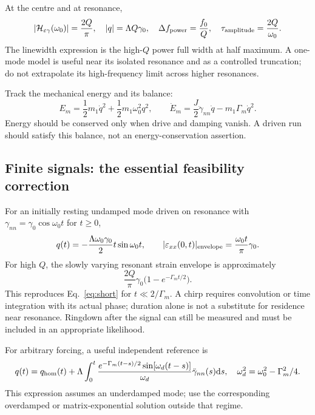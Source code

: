\documentclass[a4paper,11pt]{article}
\newcommand{\dd}{\mathrm{d}}
\newcommand{\eps}{\varepsilon}
\begin{document}
At the centre and at resonance,
\begin{equation}
 |\mathcal H_{\eps\gamma}(\omega_0)|=\frac{2Q}{\pi},\quad
 |q|=\Lambda Q\gamma_0,
 \quad \Delta f_{\rm power}=\frac{f_0}{Q},\quad
 \tau_{\rm amplitude}=\frac{2Q}{\omega_0}.
 \label{eq:resonance}
\end{equation}
The linewidth expression is the high-$Q$ power full width at half maximum. A one-mode model is useful near its isolated resonance and as a controlled truncation; do not extrapolate its high-frequency limit across higher resonances.

Track the mechanical energy and its balance:
\begin{equation}
 E_m=\frac12m_1\dot q^2+\frac12m_1\omega_0^2q^2,\qquad
 \dot E_m=\frac J2\ddot\gamma_{nn}\dot q-m_1\Gamma_m\dot q^2.
 \label{eq:energy}
\end{equation}
Energy should be conserved only when drive and damping vanish. A driven run should satisfy this balance, not an energy-conservation assertion.

\subsection{Finite signals: the essential feasibility correction}

For an initially resting undamped mode driven on resonance with
$\gamma_{nn}=\gamma_0\cos\omega_0t$ for $t\geq0$,
\begin{equation}
 q(t)=-\frac{\Lambda\omega_0\gamma_0}{2}t\sin\omega_0t,
 \qquad |\eps_{xx}(0,t)|_{\rm envelope}=\frac{\omega_0t}{\pi}\gamma_0.
 \label{eq:short}
\end{equation}
For high $Q$, the slowly varying resonant strain envelope is approximately
\begin{equation}
 \frac{2Q}{\pi}\gamma_0\bigl(1-e^{-\Gamma_mt/2}\bigr).
\end{equation}
This reproduces Eq.~\eqref{eq:short} for $t\ll2/\Gamma_m$. A chirp requires convolution or time integration with its actual phase; duration alone is not a substitute for residence near resonance. Ringdown after the signal can still be measured and must be included in an appropriate likelihood.

For arbitrary forcing, a useful independent reference is
\begin{equation}
 q(t)=q_{\rm hom}(t)+\Lambda\int_0^t
 \frac{e^{-\Gamma_m(t-s)/2}\sin[\omega_d(t-s)]}{\omega_d}
 \ddot\gamma_{nn}(s)\dd s,\quad
 \omega_d^2=\omega_0^2-\Gamma_m^2/4.
\end{equation}
This expression assumes an underdamped mode; use the corresponding overdamped or matrix-exponential solution outside that regime.
\end{document}
